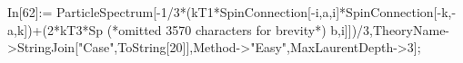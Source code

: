 In[62]:= ParticleSpectrum[-1/3*(kT1*SpinConnection[-i,a,i]*SpinConnection[-k,-a,k])+(2*kT3*Sp (*omitted 3570 characters for brevity*) b,i]])/3,TheoryName->StringJoin["Case",ToString[20]],Method->"Easy",MaxLaurentDepth->3];
